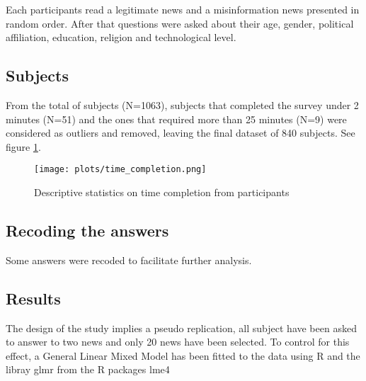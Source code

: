 \documentclass{article}
\begin{document}



Each participants read a legitimate news and a misinformation news presented in random order. After that questions were asked about their age, gender, political affiliation, education, religion and technological level.

\subsection{Subjects}
\label{ssec:subjects}

From the total of subjects (N=1063), subjects that completed the survey under 2 minutes (N=51) and the ones that required more than 25 minutes (N=9) were considered as outliers and removed, leaving the final dataset of 840 subjects. See figure \ref{fig:participants_time_completion}.

\begin{figure}[hbt]
    \centering
    \texttt{[image: plots/time\_completion.png]}
    \caption{Descriptive statistics on time completion from participants}
    \label{fig:participants_time_completion}
\end{figure}


\subsection{Recoding the answers}
Some answers were recoded to facilitate further analysis.

\subsection{Results}
\label{ssec:results}

The design of the study implies a pseudo replication, all subject have been asked to answer to two news and only 20 news have been selected. To control for this effect, a General Linear Mixed Model has been fitted to the data using R and the libray glmr from the R packages lme4 \cite{bates_fitting_2015}
\end{document}

